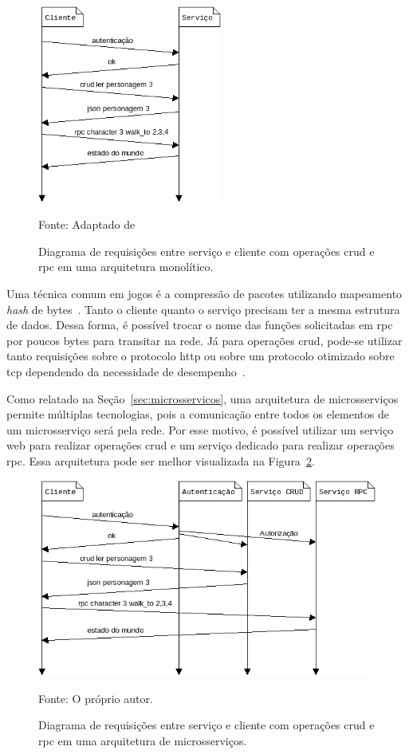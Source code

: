 \begin{figure}[htb!]
\caption{Diagrama de requisições entre serviço e cliente com operações \ac{crud} e \ac{rpc} em uma arquitetura monolítico.}
\label{fig:network_crud_rpc}
\includegraphics[height=6.5cm]{img/cap2/network_rpc_crud.png}
\centering

Fonte: Adaptado de~\cite{LeckyThompson2008Nov}
\end{figure}



Uma técnica comum em jogos é a compressão de pacotes utilizando mapeamento \textit{hash} de bytes~\cite{LeckyThompson2008Nov}.
%
Tanto o cliente quanto o serviço precisam ter a mesma estrutura de dados.
%
Dessa forma, é possível trocar o nome das funções solicitadas em \ac{rpc} por poucos bytes para transitar na rede.
%
Já para operações \ac{crud}, pode-se utilizar tanto requisições sobre o protocolo \ac{http} ou sobre um protocolo otimizado sobre \ac{tcp} dependendo da necessidade de desempenho~\cite{LeckyThompson2008Nov}.

Como relatado na Seção~\ref{sec:microsservicos}, uma arquitetura de microsserviços permite múltiplas tecnologias, pois a comunicação entre todos os elementos de um microsserviço será pela rede.
%
Por esse motivo, é possível utilizar um serviço web para realizar operações \ac{crud} e um serviço dedicado para realizar operações \ac{rpc}.
%
Essa arquitetura pode ser melhor visualizada na Figura~\ref{fig:network_crud_rpc_micro}.



\begin{figure}[htb!]
\caption{Diagrama de requisições entre serviço e cliente com operações \ac{crud} e \ac{rpc} em uma arquitetura de microsserviços.}
\label{fig:network_crud_rpc_micro}
\includegraphics[height=6.5cm]{img/cap2/network_rpc_crud_micro.png}
\centering

Fonte: O próprio autor.
\end{figure}



